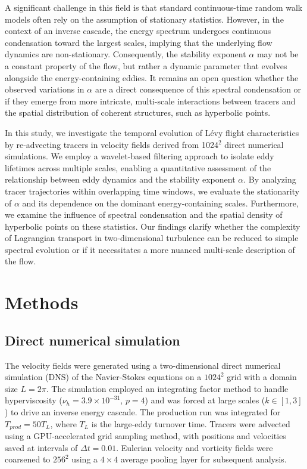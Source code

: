 \documentclass[]{article}
\begin{document}
A significant challenge in this field is that standard continuous-time random walk models often rely on the assumption of stationary statistics. However, in the context of an inverse cascade, the energy spectrum undergoes continuous condensation toward the largest scales, implying that the underlying flow dynamics are non-stationary. Consequently, the stability exponent $\alpha$ may not be a constant property of the flow, but rather a dynamic parameter that evolves alongside the energy-containing eddies. It remains an open question whether the observed variations in $\alpha$ are a direct consequence of this spectral condensation or if they emerge from more intricate, multi-scale interactions between tracers and the spatial distribution of coherent structures, such as hyperbolic points.

In this study, we investigate the temporal evolution of Lévy flight characteristics by re-advecting tracers in velocity fields derived from 1024$^2$ direct numerical simulations. We employ a wavelet-based filtering approach to isolate eddy lifetimes across multiple scales, enabling a quantitative assessment of the relationship between eddy dynamics and the stability exponent $\alpha$. By analyzing tracer trajectories within overlapping time windows, we evaluate the stationarity of $\alpha$ and its dependence on the dominant energy-containing scales. Furthermore, we examine the influence of spectral condensation and the spatial density of hyperbolic points on these statistics. Our findings clarify whether the complexity of Lagrangian transport in two-dimensional turbulence can be reduced to simple spectral evolution or if it necessitates a more nuanced multi-scale description of the flow.

\section{Methods}
\label{sec:methods}
\subsection{Direct numerical simulation}
The velocity fields were generated using a two-dimensional direct numerical simulation (DNS) of the Navier-Stokes equations on a $1024^2$ grid with a domain size $L=2\pi$. The simulation employed an integrating factor method to handle hyperviscosity ($\nu_h = 3.9 \times 10^{-31}$, $p=4$) and was forced at large scales ($k \in [1, 3]$) to drive an inverse energy cascade. The production run was integrated for $T_{prod} = 50 T_L$, where $T_L$ is the large-eddy turnover time. Tracers were advected using a GPU-accelerated grid sampling method, with positions and velocities saved at intervals of $\Delta t = 0.01$. Eulerian velocity and vorticity fields were coarsened to $256^2$ using a $4 \times 4$ average pooling layer for subsequent analysis.
\end{document}

